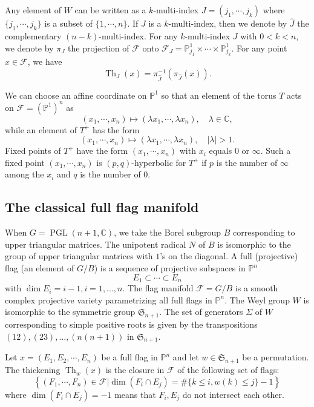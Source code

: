 \documentclass[12pt]{amsbook}%
\theoremstyle{definition}
\theoremstyle{remark}
\numberwithin{section}{chapter}
\numberwithin{subsection}{section}
\numberwithin{figure}{chapter}
\DeclareMathOperator{\PGL}{PGL}
\DeclareMathOperator{\Th}{Th}
\def\bC{{\mathbb{C}}}
\def\bP{{\mathbb{P}}}
\def\cF{{\mathscr{F}}}
\begin{document}
{{Any element of $W$ can be written as a $k$-multi-index $J=(j_1,\cdots,j_k)$ where $\{j_1,\cdots,j_k\}$ is a subset of $\{1,\cdots,n\}$. If $J$ is a $k$-multi-index, then we denote by $\hat{J}$ the complementary $(n-k)$-multi-index. For any $k$-multi-index $J$ with $0< k <n$, we denote by $\pi_J$ the projection of $\cF$ onto $\cF_J=\bP^1_{j_1}\times \cdots\times\bP^1_{j_k}$. For any point $x\in \cF$, we have
\[\Th_J(x)=\pi_{\hat{J}}^{-1}\left(\pi_{\hat{J}}(x)\right).\]

We can choose an affine coordinate on $\bP^1$ so that an element of the torus $T$ acts on $\cF=(\bP^1)^n$ as
\[(x_1,\cdots,x_n)\mapsto (\lambda x_1,\cdots,\lambda x_n), \quad \lambda\in \bC,\]
while an element of $T^+$ has the form
\[(x_1,\cdots,x_n)\mapsto (\lambda x_1,\cdots,\lambda x_n), \quad \lvert\lambda\rvert >1.\]
Fixed points of $T^+$ have the form $(x_1,\cdots,x_n)$ with $x_i$ equals $0$ or $\infty$. Such a fixed point $(x_1,\cdots,x_n)$ is $(p,q)$-hyperbolic for $T^+$ if $p$ is the number of $\infty$ among the $x_i$ and $q$ is the number of $0$.

\subsection{The classical full flag manifold}\label{homologyflagmanifolds}

When $G=\PGL(n+1,\bC)$, we take the Borel subgroup $B$ corresponding to upper triangular matrices. 
The unipotent radical $N$ of $B$ is isomorphic to the group of upper triangular matrices with $1$'s on the diagonal. 
A full (projective) flag (an element of $G/B$) is a sequence of projective subspaces in $\bP^n$
\[ E_1\subset \cdots\subset E_{n}\]
with $\dim E_i=i-1, i=1,...,n$. The flag manifold $\cF=G/B$ is a smooth complex projective variety parametrizing all full flags in $\bP^n$. The Weyl group $W$ is isomorphic to the symmetric group $\mathfrak{S}_{n+1}$. The set of generators $\Sigma$ of $W$ corresponding to simple positive roots is given by the transpositions $(12),(23),\dots,(n(n+1))$ in $\mathfrak{S}_{n+1}$. 

Let $x=(E_1, E_2, \cdots, E_{n})$ be a full flag in $\bP^n$ and let $w\in \mathfrak{S}_{n+1}$ be a permutation. 
The thickening $\Th_w(x)$ is the closure in $\cF$ of the following set of flags:
\begin{equation}
\left \{(F_1,\cdots,F_{n})\in \cF\vert \operatorname{dim}(F_i\cap E_j)=\#\{k\leq i, w(k)\leq j\}-1\right \}
\label{eq:schubertcelldescribedbypermutation}
\end{equation}
where $\operatorname{dim}(F_i\cap E_j)=-1$ means that $F_i, E_j$ do not intersect each other.




}}
\end{document}
